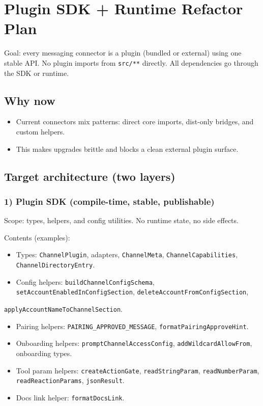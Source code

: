 \clearpage

\section{Plugin SDK + Runtime Refactor Plan}


Goal: every messaging connector is a plugin (bundled or external) using one stable API.
No plugin imports from \texttt{src/**} directly. All dependencies go through the SDK or runtime.

\subsection{Why now}


\begin{itemize}
  \item Current connectors mix patterns: direct core imports, dist-only bridges, and custom helpers.
  \item This makes upgrades brittle and blocks a clean external plugin surface.
\end{itemize}


\subsection{Target architecture (two layers)}


\subsubsection{1) Plugin SDK (compile-time, stable, publishable)}


Scope: types, helpers, and config utilities. No runtime state, no side effects.

Contents (examples):

\begin{itemize}
  \item Types: \texttt{ChannelPlugin}, adapters, \texttt{ChannelMeta}, \texttt{ChannelCapabilities}, \texttt{ChannelDirectoryEntry}.
  \item Config helpers: \texttt{buildChannelConfigSchema}, \texttt{setAccountEnabledInConfigSection}, \texttt{deleteAccountFromConfigSection},
\end{itemize}

\texttt{applyAccountNameToChannelSection}.
\begin{itemize}
  \item Pairing helpers: \texttt{PAIRING\_APPROVED\_MESSAGE}, \texttt{formatPairingApproveHint}.
  \item Onboarding helpers: \texttt{promptChannelAccessConfig}, \texttt{addWildcardAllowFrom}, onboarding types.
  \item Tool param helpers: \texttt{createActionGate}, \texttt{readStringParam}, \texttt{readNumberParam}, \texttt{readReactionParams}, \texttt{jsonResult}.
  \item Docs link helper: \texttt{formatDocsLink}.
\end{itemize}


